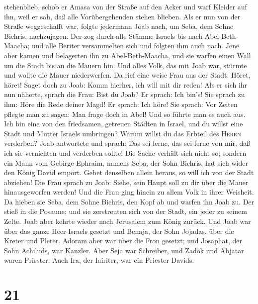 stehenblieb, schob er Amasa von der Straße auf den Acker und warf
Kleider auf ihn, weil er sah, daß alle Vorübergehenden stehen blieben.
 Als er nun von der Straße weggeschafft war, folgte
jedermann Joab nach, um Seba, dem Sohne Bichris, nachzujagen.
 Der zog durch alle Stämme Israels bis nach
Abel-Beth-Maacha; und alle Beriter versammelten sich und folgten ihm
auch nach.  Jene aber kamen und belagerten ihn zu
Abel-Beth-Maacha, und sie warfen einen Wall um die Stadt bis an die
Mauern hin. Und alles Volk, das mit Joab war, stürmte und wollte die
Mauer niederwerfen.  Da rief eine weise Frau aus der
Stadt: Höret, höret! Saget doch zu Joab: Komm hierher, ich will mit dir
reden!  Als er sich ihr nun näherte, sprach die Frau:
Bist du Joab? Er sprach: Ich bin's! Sie sprach zu ihm: Höre die Rede
deiner Magd! Er sprach: Ich höre!  Sie sprach: Vor Zeiten
pflegte man zu sagen: Man frage doch in Abel! Und so führte man es auch
aus.  Ich bin eine von den friedsamen, getreuen Städten
in Israel, und du willst eine Stadt und Mutter Israels umbringen? Warum
willst du das Erbteil des \textsc{Herrn} verderben?  Joab
antwortete und sprach: Das sei ferne, das sei ferne von mir, daß ich sie
vernichten und verderben sollte!  Die Sache verhält sich
nicht so; sondern ein Mann vom Gebirge Ephraim, namens Seba, der Sohn
Bichris, hat sich wider den König David empört. Gebet denselben allein
heraus, so will ich von der Stadt abziehen! Die Frau sprach zu Joab:
Siehe, sein Haupt soll zu dir über die Mauer hinausgeworfen werden!
 Und die Frau ging hinein zu allem Volk in ihrer
Weisheit. Da hieben sie Seba, dem Sohne Bichris, den Kopf ab und warfen
ihn Joab zu. Der stieß in die Posaune; und sie zerstreuten sich von der
Stadt, ein jeder zu seinem Zelte. Joab aber kehrte wieder nach Jerusalem
zum König zurück.  Und Joab war über das ganze Heer
Israels gesetzt und Benaja, der Sohn Jojadas, über die Kreter und
Pleter.  Adoram aber war über die Fron gesetzt; und
Josaphat, der Sohn Achiluds, war Kanzler.  Aber Seja war
Schreiber, und Zadok und Abjatar waren Priester.  Auch
Ira, der Iairiter, war ein Priester Davids.

\hypertarget{section-20}{%
\section{21}\label{section-20}}

